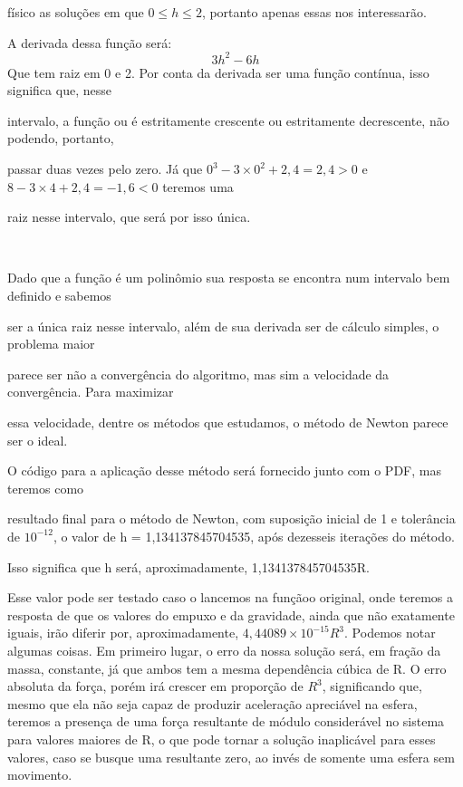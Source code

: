 \documentclass{article}
\begin{document}
f{\'i}sico as solu{\c c}{\~o}es em que $0 \leq h \leq 2$, portanto apenas
essas nos interessar{\~a}o.

A derivada dessa fun{\c c}{\~a}o ser{\'a}:
\[ 3 h^2 - 6 h \]
Que tem raiz em 0 e 2. Por conta da derivada ser uma fun{\c c}{\~a}o
cont{\'i}nua, isso significa que, nesse

intervalo, a fun{\c c}{\~a}o ou {\'e} estritamente crescente ou estritamente
decrescente, n{\~a}o podendo, portanto,

passar duas vezes pelo zero. J{\'a} que $0^3 - 3 \times 0^2 + 2, 4 = 2, 4 > 0$
e $8 - 3 \times 4 + 2, 4 = - 1, 6 < 0$ teremos uma

raiz nesse intervalo, que ser{\'a} por isso {\'u}nica.

\

Dado que a fun{\c c}{\~a}o {\'e} um polin{\^o}mio sua resposta se encontra
num intervalo bem definido e sabemos

ser a {\'u}nica raiz nesse intervalo, al{\'e}m de sua derivada ser de
c{\'a}lculo simples, o problema maior

parece ser n{\~a}o a converg{\^e}ncia do algoritmo, mas sim a velocidade da
converg{\^e}ncia. Para maximizar

essa velocidade, dentre os m{\'e}todos que estudamos, o m{\'e}todo de Newton
parece ser o ideal.

O c{\'o}digo para a aplica{\c c}{\~a}o desse m{\'e}todo ser{\'a} fornecido
junto com o PDF, mas teremos como

resultado final para o m{\'e}todo de Newton, com suposi{\c c}{\~a}o inicial de
1 e toler{\^a}ncia de $10^{- 12}$, o valor de h = 1,134137845704535, ap{\'o}s
dezesseis itera{\c c}{\~o}es do m{\'e}todo.

Isso significa que h ser{\'a}, aproximadamente, 1,134137845704535R.

Esse valor pode ser testado caso o lancemos na fun{\c c}{\~a}oo original, onde
teremos a resposta de que os valores do empuxo e da gravidade, ainda que
n{\~a}o exatamente iguais, ir{\~a}o diferir por, aproximadamente, $4, 44089
\times 10^{- 15} R^3$. Podemos notar algumas coisas. Em primeiro lugar, o erro
da nossa solu{\c c}{\~a}o ser{\'a}, em fra{\c c}{\~a}o da massa, constante,
j{\'a} que ambos tem a mesma depend{\^e}ncia c{\'u}bica de R. O erro absoluta
da for{\c c}a, por{\'e}m ir{\'a} crescer em propor{\c c}{\~a}o de $R^3$,
significando que, mesmo que ela n{\~a}o seja capaz de produzir acelera{\c
c}{\~a}o apreci{\'a}vel na esfera, teremos a presen{\c c}a de uma for{\c c}a
resultante de m{\'o}dulo consider{\'a}vel no sistema para valores maiores de
R, o que pode tornar a solu{\c c}{\~a}o inaplic{\'a}vel para esses valores,
caso se busque uma resultante zero, ao inv{\'e}s de somente uma esfera sem
movimento.

\

\
\end{document}
